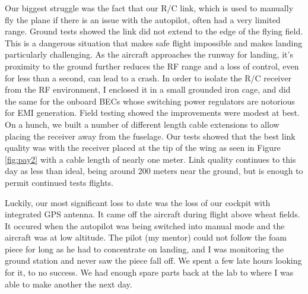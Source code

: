 \documentclass[a4paper,11pt]{report}
\begin{document}
Our biggest struggle was the fact that our R/C link, which is used to manually fly the plane if there is an issue with the autopilot, often had a very limited range. Ground tests showed the link did not extend to the edge of the flying field. This is a dangerous situation that makes safe flight impossible and makes landing particularly challenging. As the aircraft approaches the runway for landing, it's proximity to the ground further reduces the RF range and a loss of control, even for less than a second, can lead to a crash. In order to isolate the R/C receiver from the RF environment, I enclosed it in a small grounded iron cage, and did the same for the onboard BECs whose switching power regulators are notorious for EMI generation. Field testing showed the improvements were modest at best. On a hunch, we built a number of different length cable extensions to allow placing the receiver away from the fuselage. Our tests showed that the best link quality was with the receiver placed at the tip of the wing as seen in Figure \ref{fig:pay2} with a cable length of nearly one meter. Link quality continues to this day as less than ideal, being around 200 meters near the ground, but is enough to permit continued tests flights.

Luckily, our most significant loss to date was the loss of our cockpit with integrated GPS antenna. It came off the aircraft during flight above wheat fields. It occured when the autopilot was being switched into manual mode and the aircraft was at low altitude. The pilot (my mentor) could not follow the foam piece for long as he had to concentrate on landing, and I was monitoring the ground station and never saw the piece fall off. We spent a few late hours looking for it, to no success. We had enough spare parts back at the lab to where I was able to make another the next day.
\end{document}

